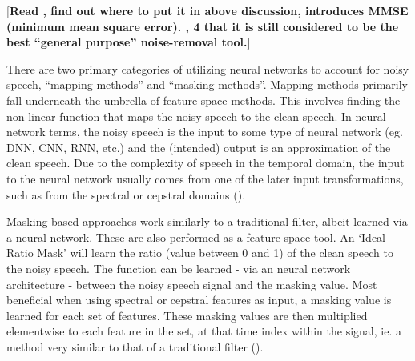 \documentclass[dissertation,copyright]{uathesis}
\begin{document}
[\textbf{Read \cite{paliwal:12}, find out where to put it in above discussion, introduces MMSE (minimum mean square error). \cite{zhang:17}, 4 that it is still considered to be the best ``general purpose'' noise-removal tool.}]


There are two primary categories of utilizing neural networks to account for noisy speech, ``mapping methods'' and ``masking methods''.  Mapping methods primarily fall underneath the umbrella of feature-space methods.  This involves finding the non-linear function that maps the noisy speech to the clean speech.  In neural network terms, the noisy speech is the input to some type of neural network (eg. DNN, CNN, RNN, etc.) and the (intended) output is an approximation of the clean speech.  Due to the complexity of speech in the temporal domain, the input to the neural network usually comes from one of the later input transformations, such as from the spectral or cepstral domains (\cite{zhang:17}).

Masking-based approaches work similarly to a traditional filter, albeit learned via a neural network. These are also performed as a feature-space tool.  An `Ideal Ratio Mask' will learn the ratio (value between 0 and 1) of the clean speech to the noisy speech.  The function can be learned - via an neural network architecture - between the noisy speech signal and the masking value.  Most beneficial when using spectral or cepstral features as input, a masking value is learned for each set of features.  These masking values are then multiplied elementwise to each feature in the set, at that time index within the signal, ie. a method very similar to that of a traditional filter (\cite{zhang:17}).
\end{document}
